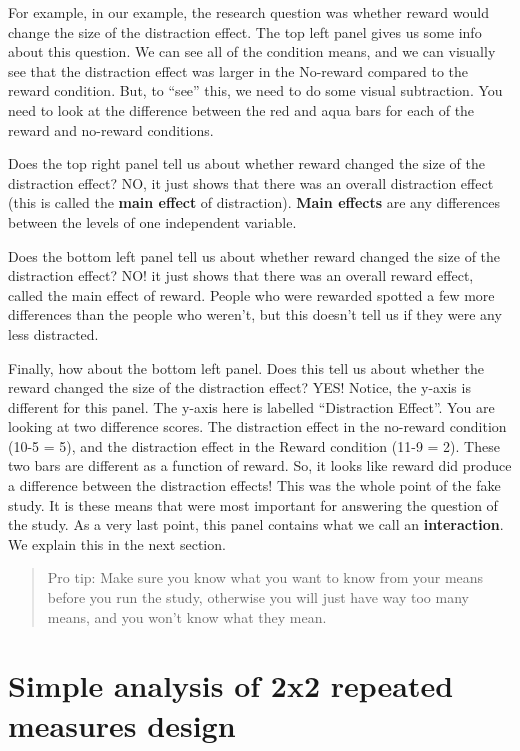 \documentclass[]{book}
\begin{document}
For example, in our example, the research question was whether reward would change the size of the distraction effect. The top left panel gives us some info about this question. We can see all of the condition means, and we can visually see that the distraction effect was larger in the No-reward compared to the reward condition. But, to ``see'' this, we need to do some visual subtraction. You need to look at the difference between the red and aqua bars for each of the reward and no-reward conditions.

Does the top right panel tell us about whether reward changed the size of the distraction effect? NO, it just shows that there was an overall distraction effect (this is called the \textbf{main effect} of distraction). \textbf{Main effects} are any differences between the levels of one independent variable.

Does the bottom left panel tell us about whether reward changed the size of the distraction effect? NO! it just shows that there was an overall reward effect, called the main effect of reward. People who were rewarded spotted a few more differences than the people who weren't, but this doesn't tell us if they were any less distracted.

Finally, how about the bottom left panel. Does this tell us about whether the reward changed the size of the distraction effect? YES! Notice, the y-axis is different for this panel. The y-axis here is labelled ``Distraction Effect''. You are looking at two difference scores. The distraction effect in the no-reward condition (10-5 = 5), and the distraction effect in the Reward condition (11-9 = 2). These two bars are different as a function of reward. So, it looks like reward did produce a difference between the distraction effects! This was the whole point of the fake study. It is these means that were most important for answering the question of the study. As a very last point, this panel contains what we call an \textbf{interaction}. We explain this in the next section.

\begin{quote}
Pro tip: Make sure you know what you want to know from your means before you run the study, otherwise you will just have way too many means, and you won't know what they mean.
\end{quote}

\hypertarget{simple-analysis-of-2x2-repeated-measures-design}{%
\section{Simple analysis of 2x2 repeated measures design}\label{simple-analysis-of-2x2-repeated-measures-design}}
\end{document}
